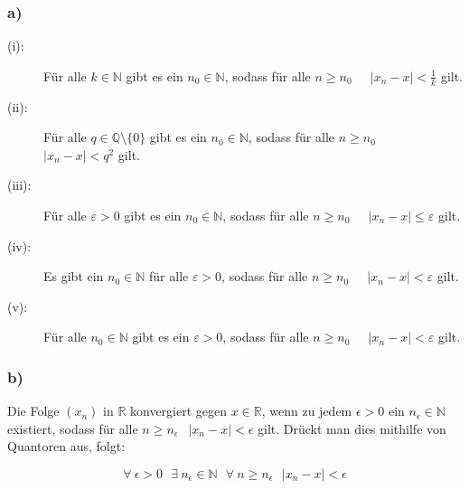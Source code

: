 \documentclass[10pt, a4paper]{article}
\begin{document}
		\subsubsection*{a)} %
		\label{ssub:a_}
		
			\begin{description}
				\item[(i):] Für alle $k\in \mathbb{N}$ gibt es ein $n_0 \in \mathbb{N}$, sodass für alle $n \geq n_0$ $\ $ $\ $ $|x_n-x| < \frac{1}{k}$ gilt.
				\item[(ii):] Für alle $q\in \mathbb{Q}\setminus\{0\}$ gibt es ein $n_0 \in \mathbb{N}$, sodass für alle $n \geq n_0$ $\ $ $\ $ $|x_n-x| < q^2$ gilt.
				\item[(iii):] Für alle $\varepsilon > 0$ gibt es ein $n_0 \in \mathbb{N}$, sodass für alle $n \geq n_0$ $\ $ $\ $ $|x_n-x| \leq \varepsilon$ gilt.
				\item[(iv):] Es gibt ein $n_0 \in \mathbb{N}$ für alle $\varepsilon > 0$, sodass für alle $n \geq n_0$ $\ $ $\ $ $|x_n-x| < \varepsilon$ gilt.
				\item[(v):] Für alle $n_0 \in \mathbb{N}$ gibt es ein $\varepsilon > 0$, sodass für alle $n \geq n_0$ $\ $ $\ $ $|x_n-x| < \varepsilon$ gilt.
			\end{description}


		\subsubsection*{b)} %
		\label{ssub:b_}
		
			Die Folge $(x_n)$ in $\mathbb{R}$ konvergiert gegen $x \in\mathbb{R}$, wenn zu jedem $\epsilon > 0$ ein $n_{\epsilon} \in \mathbb{N}$ existiert, sodass für alle $n \geq n_{\epsilon} \ \ $ $|x_n-x|<\epsilon$ gilt. Drückt man dies mithilfe von Quantoren aus, folgt:

			\[
				\forall \  \epsilon > 0 \ \ \ \exists \ n_{\epsilon} \in \mathbb{N} \ \ \ \forall \ n \geq n_{\epsilon} \ \ \ |x_n-x|<\epsilon
			\]
\end{document}
